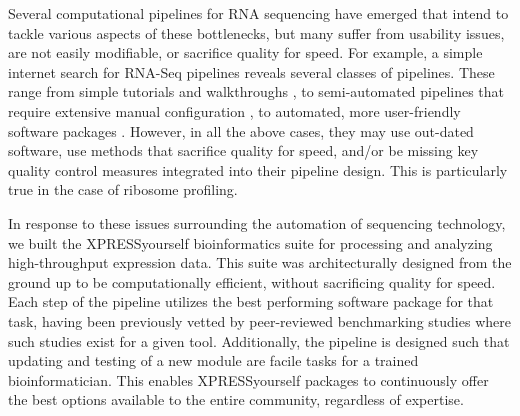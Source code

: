 \documentclass[10pt, oneside]{article}
\begin{document}
Several computational pipelines for RNA sequencing have emerged that intend to tackle various aspects of these bottlenecks, but many suffer from usability issues, are not easily modifiable, or sacrifice quality for speed. For example, a simple internet search for RNA-Seq pipelines reveals several classes of pipelines. These range from simple tutorials and walkthroughs \cite{encode_pipeline, gdc_pipeline}, to semi-automated pipelines that require extensive manual configuration \cite{pavlidis_pipeline, nfcore_pipeline, umcu_pipeline, cellgeni_pipeline}, to automated, more user-friendly software packages \cite{dnanexus_pipeline, nextflow_pipeline, galaxy, ribogalaxy}. However, in all the above cases, they may use out-dated software, use methods that sacrifice quality for speed, and/or be missing key quality control measures integrated into their pipeline design. This is particularly true in the case of ribosome profiling. \par

In response to these issues surrounding the automation of sequencing technology, we built the XPRESSyourself bioinformatics suite for processing and analyzing high-throughput expression data. This suite was architecturally designed from the ground up to be computationally efficient, without sacrificing quality for speed. Each step of the pipeline utilizes the best performing software package for that task, having been previously vetted by peer-reviewed benchmarking studies where such studies exist for a given tool. Additionally, the pipeline is designed such that updating and testing of a new module are facile tasks for a trained bioinformatician. This enables XPRESSyourself packages to continuously offer the best options available to the entire community, regardless of expertise. \par
\end{document}
